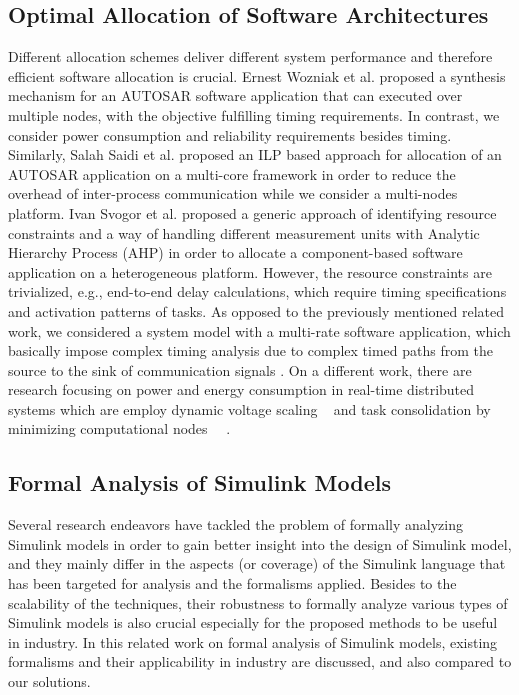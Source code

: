 \subsection{Optimal Allocation of Software Architectures}
Different allocation schemes deliver different system performance and therefore efficient software allocation is crucial. Ernest Wozniak et al. \cite{Wozniak2013AnArchitectures} proposed a synthesis mechanism for an AUTOSAR software application that can executed over multiple nodes, with the objective fulfilling timing requirements. In contrast, we consider power consumption and reliability requirements besides timing. Similarly, Salah Saidi et al. \cite{Saidi2015AnArchitectures} proposed an ILP based approach for allocation of an AUTOSAR application on a multi-core framework in order to reduce the overhead of inter-process communication while we consider a multi-nodes platform. Ivan Svogor et al. \cite{vsvogor2014extended} proposed a generic approach of identifying resource constraints and a way of handling different measurement units with Analytic Hierarchy Process (AHP) in order to allocate a component-based software application on a heterogeneous platform. However, the resource constraints are trivialized, e.g., end-to-end delay calculations, which require timing specifications and activation patterns of tasks. As opposed to the previously mentioned related work, we considered a system model with a multi-rate software application, which basically impose complex timing analysis due to complex timed paths from the source to the sink of communication signals \cite{mubeen2013support}. On a different work, there are research focusing on power and energy consumption in real-time distributed systems which are employ dynamic voltage scaling ~\cite{bambagini2016energy} and task consolidation by minimizing computational nodes ~\cite{faragardi2013towards}~\cite{devadas2012interplay}.

\subsection{Formal Analysis of Simulink Models}
Several research endeavors have tackled the problem of formally analyzing Simulink models in order to gain better insight into the design of Simulink model, and they mainly differ in the aspects (or coverage) of the Simulink language that has been targeted for analysis and the formalisms applied. Besides to the scalability of the techniques, their robustness to formally analyze various types of Simulink models is also crucial especially for the proposed methods to be useful in industry. In this related work on formal analysis of Simulink models, existing formalisms and their applicability in industry are discussed, and also compared to our solutions.

